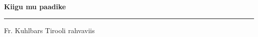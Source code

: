 \documentclass[10pt]{book}
\begin{document}
{
  \samepage
  \raggedbottom
  \raggedright
  \sloppy


  \vspace{0.2in}

  \noindent\begin{minipage}{.1\textwidth}
    \hfill\vspace{0.1in}
  \end{minipage}%
  \noindent\begin{minipage}{.8\textwidth}
    \centering
    \bfseries
    \large Kiigu mu paadike
  \end{minipage}%
  \noindent\begin{minipage}{.1\textwidth}
      \hfill\vspace{0.1in}
  \end{minipage}

  \nopagebreak[4]
  \vspace{0.1in}
  \nopagebreak[4]
  \hrule height 0.05ex
  \nopagebreak[4]
  \vspace{-0.05in}

  {\footnotesize Fr. Kuhlbars \hfill Tirooli rahvaviis }\\
  \vspace{0.01in}



}
\end{document}
